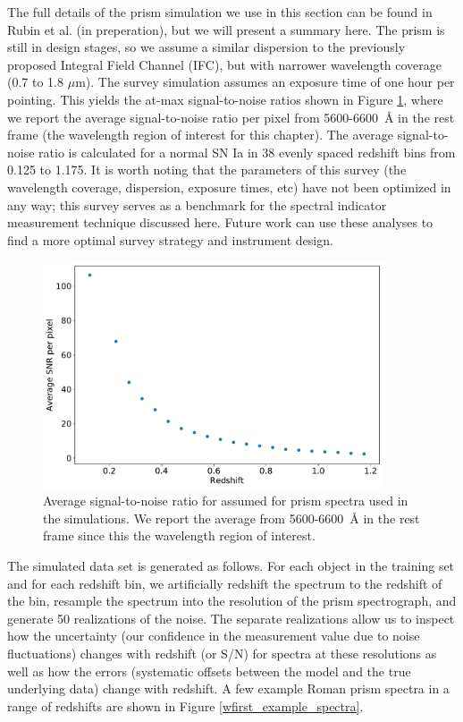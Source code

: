The full details of the prism simulation we use in this section can be found in Rubin et al. (in preperation), but we will present a summary here. The prism is still in design stages, so we assume a similar dispersion to the previously proposed Integral Field Channel (IFC), but with narrower wavelength coverage (0.7 to 1.8 $\mu$m). The survey simulation assumes an exposure time of one hour per pointing. This yields the at-max signal-to-noise ratios shown in Figure \ref{snr_wfirst_prism}, where we report the average signal-to-noise ratio per pixel from 5600-6600~\AA{} in the rest frame (the wavelength region of interest for this chapter). The average signal-to-noise ratio is calculated for a normal SN Ia in 38 evenly spaced redshift bins from 0.125 to 1.175. It is worth noting that the parameters of this survey (the wavelength coverage, dispersion, exposure times, etc) have not been optimized in any way; this survey serves as a benchmark for the spectral indicator measurement technique discussed here. Future work can use these analyses to find a more optimal survey strategy and instrument design.

\begin{figure}[htbp]
    \centering
    \includegraphics[width=0.9\textwidth]{figures/si_feat_pca/wfirst_snr_vs_redshift.pdf}
    \caption{Average signal-to-noise ratio for assumed for prism spectra used in the simulations. We report the average from 5600-6600~\AA{} in the rest frame since this the wavelength region of interest.}
    \label{snr_wfirst_prism}
\end{figure}

The simulated data set is generated as follows. For each object in the training set and for each redshift bin, we artificially redshift the spectrum to the redshift of the bin, resample the spectrum into the resolution of the prism spectrograph, and generate 50 realizations of the noise. The separate realizations allow us to inspect how the uncertainty (our confidence in the measurement value due to noise fluctuations) changes with redshift (or S/N) for spectra at these resolutions as well as how the errors (systematic offsets between the model and the true underlying data) change with redshift. A few example Roman prism spectra in a range of redshifts are shown in Figure \ref{wfirst_example_spectra}.

